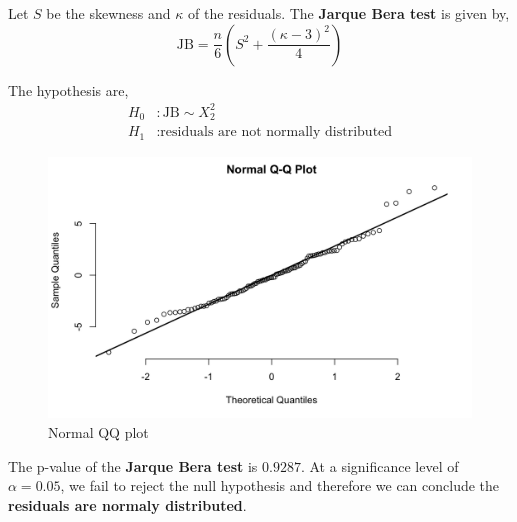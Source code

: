 Let $S$ be the skewness and $\kappa$ of the residuals. The \textbf{Jarque Bera test} is given by, 
\begin{equation}
	\text{JB} = \frac{n}{6} \left(S^2 + \frac{(\kappa - 3)^2}{4} \right)
\end{equation}

The hypothesis are, 
\begin{align*}
	H_0&: \text{JB} \sim X^2_2 \\
	H_1&: \text{residuals are not normally distributed}
\end{align*}

\begin{figure}[H]
	\centering
	\includegraphics{figures/normal-qq-plot.png}
	\caption{Normal QQ plot}
	\label{fig}
\end{figure}

The p-value of the \textbf{Jarque Bera test} is $0.9287$. At a significance level of $\alpha = 0.05$, we fail to reject the null hypothesis and therefore we can conclude the \textbf{residuals are normaly distributed}. 